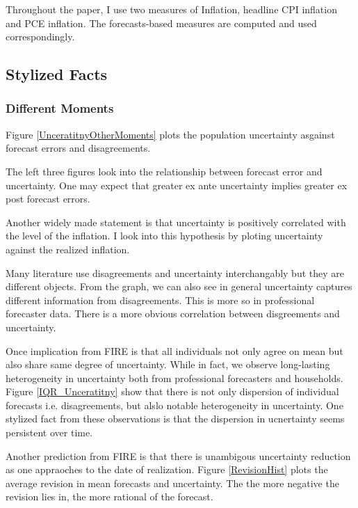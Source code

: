 \documentclass[]{article}
\begin{document}
Throughout the paper, I use two measures of Inflation, headline CPI inflation and PCE inflation. The forecasts-based measures are computed and used correspondingly.  

\subsection{Stylized Facts}

\subsubsection{Different Moments}

Figure \ref{UnceratitnyOtherMoments} plots the population uncertainty asgainst forecast errors and disagreements. 


The left  three figures look into the relationship between forecast error and uncertainty. One may expect that  greater ex ante uncertainty implies greater ex post forecast errors. 

Another widely made statement is that uncertainty is positively correlated with the level of the inflation. I look into this hypothesis by ploting uncertainty against the realized inflation.  
 
Many literature use disagreements and uncertainty interchangably but they are different objects. From the graph, we can also see in general uncertainty captures different information from disagreements. This is more so in professional forecaster data. There is a more obvious correlation between disgreements and uncertainty. 

Once implication from FIRE is that all individuals not only agree on mean but also share same degree of uncertainty. While in fact, we observe long-lasting heterogeneity in uncertainty both from professional forecasters and households. Figure \ref{IQR_Unceratitny} show that there is  not only dispersion of individual forecasts i.e. disagreements, but alslo notable heterogeneity in uncertainty. One stylized fact from these observations is that  the dispersion in ucnertainty seems persistent over time.  
 

Another prediction from FIRE is that there is unambigous uncertainty reduction as one appraoches to the date of realization. Figure \ref{RevisionHist} plots the average revision in mean forecasts and uncertainty. The the more negative the revision lies in, the more rational of the forecast.  
\end{document}
